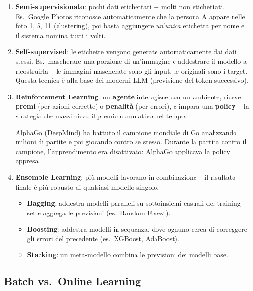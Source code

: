 \begin{enumerate}
    \item \textbf{Semi-supervisionato}: pochi dati etichettati + molti non etichettati. Es.\ Google Photos riconosce automaticamente che la persona A appare nelle foto 1, 5, 11 (clustering), poi basta aggiungere \emph{un'unica} etichetta per nome e il sistema nomina tutti i volti.

    \item \textbf{Self-supervised}: le etichette vengono generate automaticamente dai dati stessi. Es.\ mascherare una porzione di un'immagine e addestrare il modello a ricostruirla -- le immagini mascherate sono gli input, le originali sono i target. Questa tecnica è alla base dei moderni LLM (previsione del token successivo).

    \item \textbf{Reinforcement Learning}: un \textbf{agente} interagisce con un ambiente, riceve \textbf{premi} (per azioni corrette) o \textbf{penalità} (per errori), e impara una \textbf{policy} -- la strategia che massimizza il premio cumulativo nel tempo.
    \begin{exbox}
        AlphaGo (DeepMind) ha battuto il campione mondiale di Go analizzando milioni di partite e poi giocando contro se stesso. Durante la partita contro il campione, l'apprendimento era disattivato: AlphaGo applicava la policy appresa.
    \end{exbox}

    \item \textbf{Ensemble Learning}: più modelli lavorano in combinazione -- il risultato finale è più robusto di qualsiasi modello singolo.
    \begin{itemize}
        \item \textbf{Bagging}: addestra modelli paralleli su sottoinsiemi casuali del training set e aggrega le previsioni (es.\ Random Forest).
        \item \textbf{Boosting}: addestra modelli in sequenza, dove ognuno cerca di correggere gli errori del precedente (es.\ XGBoost, AdaBoost).
        \item \textbf{Stacking}: un meta-modello combina le previsioni dei modelli base.
    \end{itemize}
\end{enumerate}

\subsection{Batch vs.\ Online Learning}

